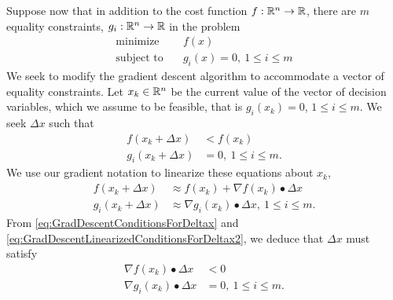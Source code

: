 Suppose now that in addition to the cost function $f:\mathbb R^n \to \mathbb R$, there are $m$ equality constraints, $g_i:\mathbb R^n \to \mathbb R$ in the problem
\begin{equation}
\label{eq:GenericMultiConstraintOptimizationProblemContextGradientDescent}
\begin{aligned}
\text{minimize} \quad & f(x)\\
\text{subject to} \quad & g_i(x) = 0, ~1 \le i \le m
\end{aligned}    
\end{equation}
We seek to modify the gradient descent algorithm to accommodate a vector of equality constraints. Let $x_k \in \mathbb R^n$  be the current value of the vector of decision variables, which we assume to be feasible, that is $g_i(x_k) = 0$, $1 \le i \le m$. We seek $\Delta x$ such that
\begin{equation}
\label{eq:GradDescentConditionsVector ConstraintsForDeltax}
\begin{aligned}    
    f(x_k + \Delta x) & < f(x_k) \\
    g_i(x_k + \Delta x) & =0, ~1 \le i \le m.
\end{aligned}
\end{equation}
We use our gradient notation to linearize these equations about $x_k$,
\begin{equation}
\label{eq:GradDescentLinearizedConditionsForDeltax2}
\begin{aligned}    
    f(x_k + \Delta x) & \approx f(x_k)  + \nabla f(x_k) \bullet \Delta x\\
    g_i(x_k + \Delta x) & \approx \nabla g_i(x_k) \bullet \Delta x,  ~1 \le i \le m.
\end{aligned}
\end{equation}
From \eqref{eq:GradDescentConditionsForDeltax} and \eqref{eq:GradDescentLinearizedConditionsForDeltax2}, we deduce that $\Delta x$ must satisfy 
\begin{equation}
\begin{aligned}    
    \nabla f(x_k) \bullet \Delta x &< 0\\
    \nabla g_i(x_k) \bullet \Delta x &= 0,  ~1 \le i \le m.
\end{aligned}
\end{equation}

